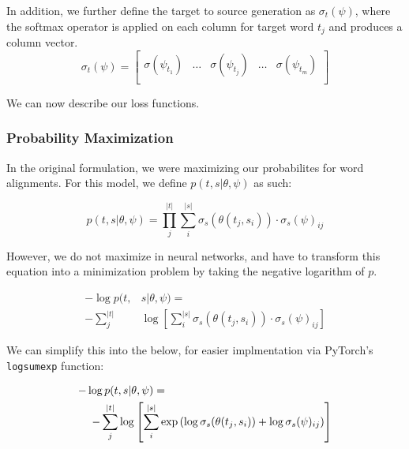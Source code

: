 \documentclass[twoside,twocolumn]{article}
\begin{document}
In addition, we further define the target to source generation as $\sigma_t(\psi)$, where the softmax operator is applied on each column for target word $t_j$ and produces a column vector.
\begin{equation}
  \sigma_t(\psi) = \left[
    \begin{matrix}
      \sigma(\psi_{t_1}) &
      \hdots &
      \sigma(\psi_{t_j}) &
      \hdots &
      \sigma(\psi_{t_m})  \\
    \end{matrix}
\right]
\end{equation}

We can now describe our loss functions.

\subsubsection{Probability Maximization}
In the original formulation, we were maximizing our probabilites for word alignments. For this model, we define $p(t, s | \theta, \psi)$ as such:

\begin{equation}
  p(t, s | \theta, \psi) = \prod_j^{|t|} \sum_i^{|s|} \sigma_s(\theta(t_j, s_i)) \cdot \sigma_s(\psi)_{ij}
\end{equation}

However, we do not maximize in neural networks, and have to transform this equation into a minimization problem by taking the negative logarithm of $p$.

\begin{equation}
  \begin{split}
  -\log p(t, & s | \theta, \psi) = \\
  - \sum_j^{|t|} & \log \left[ \sum_i^{|s|} \sigma_s \left( \theta(t_j, s_i) \right) \cdot \sigma_s(\psi)_{ij} \right]
\end{split}
\end{equation}

We can simplify this into the below, for easier implmentation via PyTorch's \texttt{logsumexp} function:

\begin{equation}
  \centering
  \begin{split}
  -\log  p(t & , s | \theta, \psi) = \\
  - \sum_j^{|t|} & \log \left[ \sum_i^{|s|} \exp \left( \log \sigma_s(\theta(t_j, s_i)) + \log \sigma_s(\psi)_{ij} \right) \right]
\end{split}
\end{equation}
\end{document}
